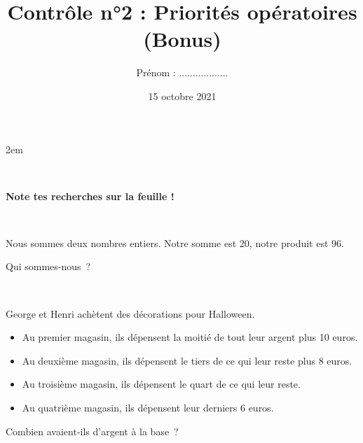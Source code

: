 \documentclass[a4paper,11pt]{article}
\title{Contrôle n°2 : Priorités opératoires (Bonus)}
\date{15 octobre 2021}
\author{Prénom : ..................}
\makeatletter
\renewcommand{\maketitle}{%
    \topskip2em
	\@author \hfill \@date \\

	\begin{center}
		\begin{huge}
			\@title \\[2em]
		\end{huge}
	\end{center}
}
\makeatother
\begin{document}
\maketitle

\begin{center}
	\large
	\textbf{Note tes recherches sur la feuille !}
\end{center}

\begin{question*}[Bonus]\

	Nous sommes deux nombres entiers. Notre somme est 20, notre produit est 96.

	Qui sommes-nous ?
	\vspace{10em}
\end{question*}

\begin{question*}[Bonus]\

	George et Henri achètent des décorations pour Halloween.
	\begin{itemize}
		\item Au premier magasin, ils dépensent la moitié de tout leur argent plus 10 euros.
		\item Au deuxième magasin, ils dépensent le tiers de ce qui leur reste plus 8 euros.
		\item Au troisième magasin, ils dépensent le quart de ce qui leur reste.
		\item Au quatrième magasin, ils dépensent leur derniers 6 euros.
	\end{itemize}
	Combien avaient-ils d’argent à la base ?
\end{question*}
\end{document}
